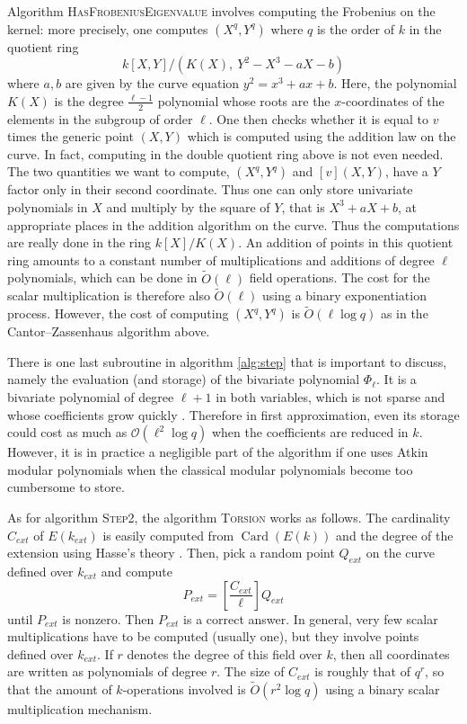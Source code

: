 \documentclass{article}
\renewcommand{\O}{\mathcal{O}}
\newcommand{\softO}{\tilde{O}}
\newcommand{\algstyle}[1]{\textsc{#1}}
\renewcommand{\v}{\vspace{5mm}}
\theoremstyle{definition}
\DeclareMathOperator{\Card}{Card}
\begin{document}
Algorithm \algstyle{HasFrobeniusEigenvalue}
involves computing the Frobenius on the kernel: more precisely, one computes $(X^q, Y^q)$
where $q$ is the order of $k$ in the quotient ring
\[
k[X, Y]/(K(X),\ Y^2 - X^3 - aX - b)
\]
where $a, b$ are given by the curve equation $y^2 = x^3 + ax + b$. Here, the polynomial
$K(X)$ is the degree $\frac{\ell-1}{2}$ polynomial whose roots are the $x$-coordinates of the elements
in the subgroup of order $\ell$. One then checks whether it is equal to $v$ times the generic
point $(X, Y)$ which is computed using the addition law on the curve. In fact, computing
in the double quotient ring above is not even needed. The two quantities we want to compute,
$(X^q, Y^q)$ and $[v](X, Y)$, have a $Y$ factor only in their second coordinate. Thus one
can only store univariate polynomials in $X$ and multiply by the square of $Y$, that is
$X^3 + aX + b$, at appropriate places in the addition algorithm on the curve. Thus the
computations are really done in the ring $k[X]/K(X)$. An addition of points in this
quotient ring amounts to a constant number of multiplications and additions of degree $\ell$
polynomials, which can be done in $\softO(\ell)$ field operations.
The cost for the scalar multiplication is therefore also
$\softO(\ell)$ using a binary exponentiation process. However, the cost of computing
$(X^q, Y^q)$ is $\softO(\ell\log q)$ as in the Cantor--Zassenhaus algorithm above.

There is one last subroutine in algorithm \ref{alg:step} that is important to discuss,
namely the evaluation (and storage) of the bivariate polynomial $\Phi_\ell$. It is a bivariate
polynomial of degree $\ell + 1$ in both variables, which is not sparse and whose coefficients
grow quickly \cite{}. Therefore in first approximation, even its storage could cost as much as
$\O(\ell^2 \log q)$ when the coefficients are reduced in $k$. However, it is in practice a negligible
part of the algorithm if one uses Atkin modular polynomials
when the classical modular polynomials become too cumbersome to store.
\v

As for algorithm \algstyle{Step2}, the algorithm \algstyle{Torsion} works as follows.
The cardinality $C_{ext}$ of $E(k_{ext})$ is easily computed from $\Card(E(k))$
and the degree of the extension using Hasse's theory \cite{}.
Then, pick a random point $Q_{ext}$ on the curve defined over $k_{ext}$ and compute
\[
P_{ext} = \left[\frac{C_{ext}}{\ell}\right]Q_{ext}
\]
until $P_{ext}$ is nonzero. Then $P_{ext}$ is a correct answer.
In general, very few scalar multiplications have to be computed (usually one),
but they involve points defined over $k_{ext}$. If $r$ denotes the degree of
this field over $k$, then all coordinates are written as polynomials of degree
$r$. The size of $C_{ext}$ is roughly that of $q^r$, so that the amount of $k$-operations
 involved is $\softO(r^2\log q)$ using a binary scalar multiplication mechanism.
\end{document}
